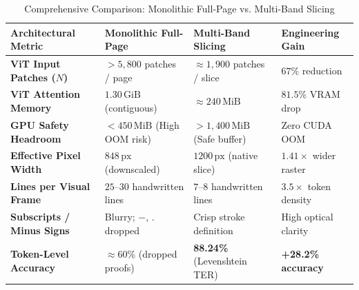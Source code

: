 \begin{table}[htbp]
\centering
\caption{Comprehensive Comparison: Monolithic Full-Page vs. Multi-Band Slicing}
\label{tab:monolithic_vs_slicing_comparison}
\vspace{0.2cm}
\small
\begin{tabular}{p{3.2cm}p{3.8cm}p{3.8cm}p{2.4cm}}
\toprule
\textbf{Architectural Metric} & \textbf{Monolithic Full-Page} & \textbf{Multi-Band Slicing} & \textbf{Engineering Gain} \\
\midrule
\textbf{ViT Input Patches ($N$)} & $> 5,800$ patches / page & $\approx 1,900$ patches / slice & $67\%$ reduction \\
\addlinespace
\textbf{ViT Attention Memory} & $1.30\,\text{GiB}$ (contiguous) & $\approx 240\,\text{MiB}$ & $81.5\%$ VRAM drop \\
\addlinespace
\textbf{GPU Safety Headroom} & $< 450\,\text{MiB}$ (High OOM risk) & $> 1,400\,\text{MiB}$ (Safe buffer) & Zero CUDA OOM \\
\addlinespace
\textbf{Effective Pixel Width} & $848\,\text{px}$ (downscaled) & $1200\,\text{px}$ (native slice) & $1.41\times$ wider raster \\
\addlinespace
\textbf{Lines per Visual Frame} & $25$--$30$ handwritten lines & $7$--$8$ handwritten lines & $3.5\times$ token density \\
\addlinespace
\textbf{Subscripts / Minus Signs} & Blurry; $-$, $.$ dropped & Crisp stroke definition & High optical clarity \\
\addlinespace
\textbf{Token-Level Accuracy} & $\approx 60\%$ (dropped proofs) & \textbf{88.24\%} (Levenshtein TER) & \textbf{+28.2\% accuracy} \\
\bottomrule
\end{tabular}
\end{table}
